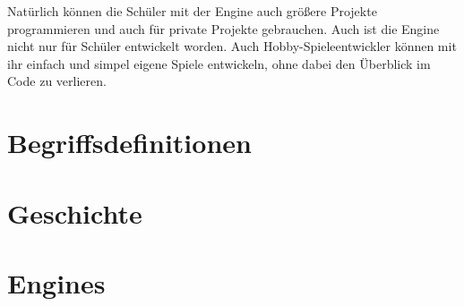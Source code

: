 Natürlich können die Schüler mit der Engine auch größere Projekte programmieren und auch für private Projekte gebrauchen. Auch ist die Engine nicht nur für Schüler entwickelt worden. Auch Hobby-Spieleentwickler können mit ihr einfach und simpel eigene Spiele entwickeln, ohne dabei den Überblick im Code zu verlieren.

\section{Begriffsdefinitionen}




\section{Geschichte}



\section{Engines}
\label{engines}



